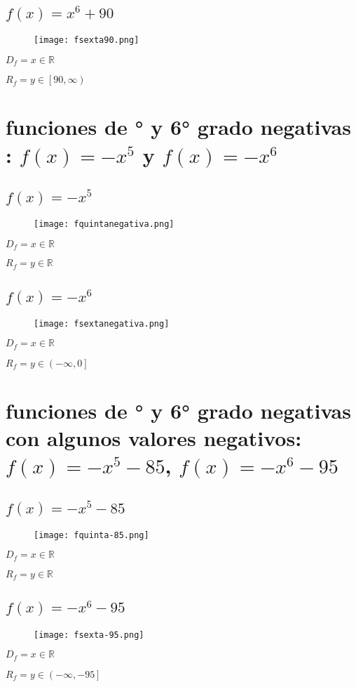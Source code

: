 \documentclass[12pt]{article}
\begin{document}
\subsection{$f(x) = x^6 + 90$}
\begin{figure}[htb] \centering \texttt{[image: fsexta90.png]} 
\end{figure}
$D_f = x \in \mathbb{R}$ \par
$R_f = y \in \left[90,\infty\right)$ 
\newpage
\section{funciones de {° y 6° grado negativas }: $f(x) = -x^5$ y $f(x) = -x^6$}
\subsection{$f(x) = -x^5$}
\begin{figure}[htb] \centering \texttt{[image: fquintanegativa.png]} 
\end{figure}
$D_f = x \in \mathbb{R}$ \par
$R_f = y \in \mathbb{R}$ 
\subsection{$f(x) = -x^6$}
\begin{figure}[htb] \centering \texttt{[image: fsextanegativa.png]} 
\end{figure}
$D_f = x \in \mathbb{R}$ \par
$R_f = y \in \left(-\infty,0\right]$ 
\newpage
\section{funciones de {° y 6° grado negativas }con algunos {\cyan valores negativos}: $f(x) = -x^5 - 85$, $f(x) = -x^6 - 95$} 
\subsection{$f(x) = -x^5 - 85$}
\begin{figure}[htb] \centering \texttt{[image: fquinta-85.png]} 
\end{figure}
$D_f = x \in \mathbb{R}$ \par
$R_f = y \in \mathbb{R}$ 
\subsection{$f(x) = -x^6 - 95$}
\begin{figure}[htb] \centering \texttt{[image: fsexta-95.png]} 
\end{figure}
$D_f = x \in \mathbb{R}$ \par
$R_f = y \in \left(-\infty,-95\right]$ 
\newpage
\end{document}
